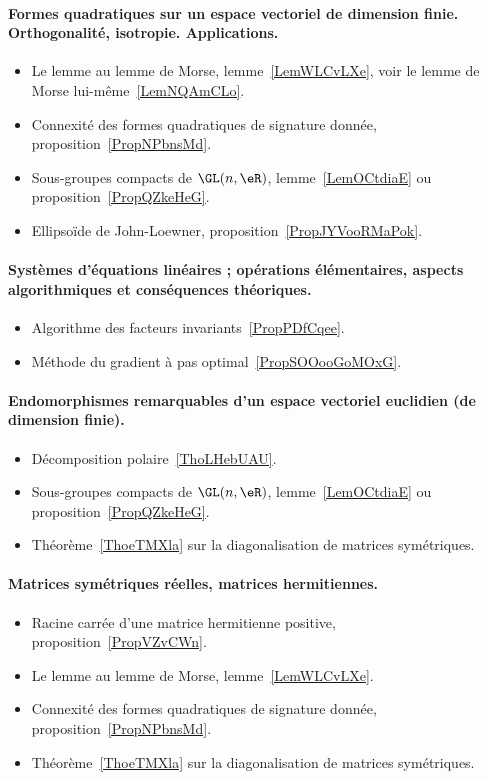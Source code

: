 \paragraph{Formes quadratiques sur un espace vectoriel de dimension finie. Orthogonalité, isotropie. Applications.}
\begin{itemize}
	\item Le lemme au lemme de Morse, lemme~\ref{LemWLCvLXe}, voir le lemme de Morse lui-même~\ref{LemNQAmCLo}.
	\item Connexité des formes quadratiques de signature donnée, proposition~\ref{PropNPbnsMd}.
	\item Sous-groupes compacts de \( \GL(n,\eR)\), lemme~\ref{LemOCtdiaE} ou proposition~\ref{PropQZkeHeG}.
	\item Ellipsoïde de John-Loewner, proposition~\ref{PropJYVooRMaPok}.
\end{itemize}
\paragraph{Systèmes d'équations linéaires ; opérations élémentaires, aspects algorithmiques et conséquences théoriques.}
\begin{itemize}
	\item Algorithme des facteurs invariants~\ref{PropPDfCqee}.
	\item Méthode du gradient à pas optimal~\ref{PropSOOooGoMOxG}.
\end{itemize}
\paragraph{Endomorphismes remarquables d’un espace vectoriel euclidien (de dimension finie).}
\begin{itemize}
	\item Décomposition polaire~\ref{ThoLHebUAU}.
	\item Sous-groupes compacts de \( \GL(n,\eR)\), lemme~\ref{LemOCtdiaE} ou proposition~\ref{PropQZkeHeG}.
	\item Théorème~\ref{ThoeTMXla} sur la diagonalisation de matrices symétriques.
\end{itemize}
\paragraph{Matrices symétriques réelles, matrices hermitiennes.}
\begin{itemize}
	\item Racine carrée d'une matrice hermitienne positive, proposition~\ref{PropVZvCWn}.
	\item Le lemme au lemme de Morse, lemme~\ref{LemWLCvLXe}.
	\item Connexité des formes quadratiques de signature donnée, proposition~\ref{PropNPbnsMd}.
	\item Théorème~\ref{ThoeTMXla} sur la diagonalisation de matrices symétriques.
\end{itemize}
